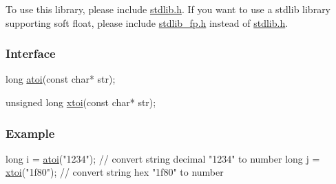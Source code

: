To use this library, please include {\ttfamily \mbox{\hyperlink{a00116}{stdlib.\+h}}}. If you want to use a stdlib library supporting soft float, please include {\ttfamily \mbox{\hyperlink{a00125}{stdlib\+\_\+fp.\+h}}} instead of {\ttfamily \mbox{\hyperlink{a00116}{stdlib.\+h}}}.

\subsubsection*{Interface}


\begin{DoxyCode}
\textcolor{keywordtype}{long} \mbox{\hyperlink{a00113_a36f90d5de53f568b0fc5266ce013b9c5}{atoi}}(\textcolor{keyword}{const} \textcolor{keywordtype}{char}* str);

\textcolor{keywordtype}{unsigned} \textcolor{keywordtype}{long} \mbox{\hyperlink{a00113_a9d6165da864d16ad50c13690c1e7d7ea}{xtoi}}(\textcolor{keyword}{const} \textcolor{keywordtype}{char}* str);
\end{DoxyCode}


\subsubsection*{Example}


\begin{DoxyCode}
\textcolor{keywordtype}{long} i = \mbox{\hyperlink{a00113_a36f90d5de53f568b0fc5266ce013b9c5}{atoi}}(\textcolor{stringliteral}{"1234"});            \textcolor{comment}{// convert string decimal "1234" to number}
\textcolor{keywordtype}{long} j = \mbox{\hyperlink{a00113_a9d6165da864d16ad50c13690c1e7d7ea}{xtoi}}(\textcolor{stringliteral}{"1f80"});            \textcolor{comment}{// convert string hex "1f80" to number}
\end{DoxyCode}
 